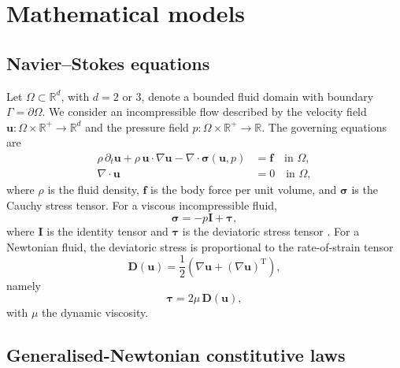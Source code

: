 \documentclass[lineno]{jfm}
\begin{document}
\section{Mathematical models}
\label{sec:models}

\subsection{Navier--Stokes equations}

Let $\Omega\subset\mathbb{R}^{d}$, with $d=2$ or $3$, denote a bounded fluid domain with boundary $\Gamma=\partial\Omega$. We consider an incompressible flow described by the velocity field $\boldsymbol{u}:\Omega\times\mathbb{R}^{+}\rightarrow\mathbb{R}^{d}$ and the pressure field $p:\Omega\times\mathbb{R}^{+}\rightarrow\mathbb{R}$. The governing equations are
\begin{align}
\rho\,\partial_t\boldsymbol{u}+\rho\,\boldsymbol{u}\cdot\nabla\boldsymbol{u}-\nabla\cdot\boldsymbol{\sigma}(\boldsymbol{u},p)&=\boldsymbol{f}
\quad \text{in } \Omega,\label{eq:fluid-general-a}\\
\nabla\cdot\boldsymbol{u}&=0
\quad \text{in } \Omega,\label{eq:fluid-general-b}
\end{align}
where $\rho$ is the fluid density, $\boldsymbol{f}$ is the body force per unit volume, and $\boldsymbol{\sigma}$ is the Cauchy stress tensor. For a viscous incompressible fluid,
\begin{equation}
\boldsymbol{\sigma}=-p\boldsymbol{I}+\boldsymbol{\tau},\label{eq:cauchy-stress}
\end{equation}
where $\boldsymbol{I}$ is the identity tensor and $\boldsymbol{\tau}$ is the deviatoric stress tensor \citep{SPENCER-DOVER,Sequeria2018}. For a Newtonian fluid, the deviatoric stress is proportional to the rate-of-strain tensor
\begin{equation}
\boldsymbol{D}(\boldsymbol{u})=\frac{1}{2}\left(\nabla\boldsymbol{u}+(\nabla\boldsymbol{u})^{\mathrm{T}}\right),\label{eq:rate-strain}
\end{equation}
namely
\begin{equation}
\boldsymbol{\tau}=2\mu\,\boldsymbol{D}(\boldsymbol{u}),\label{eq:tau-newtonian}
\end{equation}
with $\mu$ the dynamic viscosity.

\subsection{Generalised-Newtonian constitutive laws}
\end{document}

